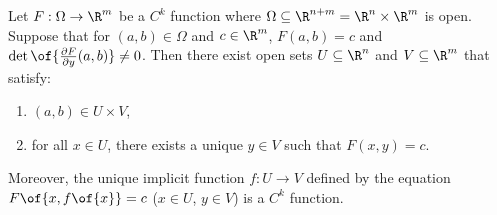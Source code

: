 \begin{theorem}
    Let $F: \Omega \to \R^m$ be a $C^k$ function where $\Omega \subseteq \R^{n + m} = \R^n \times \R^m$ is open. Suppose that for $(a,b) \in \Omega$ and $c \in \R^m$, $F(a,b) = c$ and $\det \of{\frac{\partial F}{\partial y}(a,b)} \neq 0$. Then there exist open sets $U \subseteq \R^n$ and $V \subseteq \R^m$ that satisfy:
    \begin{enumerate}
        \item $(a,b) \in U \times V$,
        \item for all $x \in U$, there exists a unique $y \in V$ such that $F(x,y) = c$.
    \end{enumerate}
    Moreover, the unique implicit function $f: U \to V$ defined by the equation $F\of{x,f\of{x}} = c$ ($x \in U$, $y \in V$) is a $C^k$ function.
\end{theorem}
